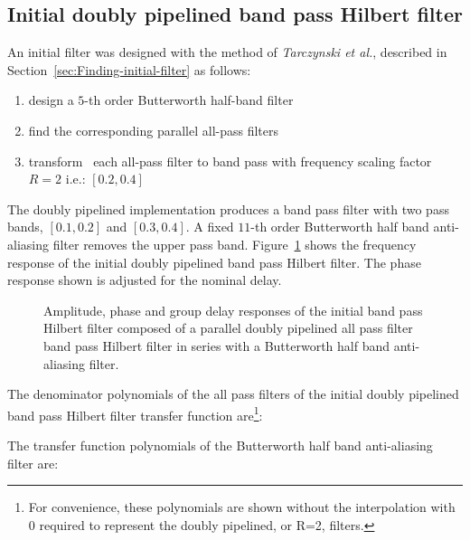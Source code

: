 \documentclass[a4paper,twoside,10pt,english]{article}
\newcommand{\DesignOfSchurLatticeFiltersPdfScale}{1}
\begin{document}
\subsection{Initial doubly pipelined band pass Hilbert filter}
An initial filter was designed with the method of \emph{Tarczynski et al.},
described in Section~\ref{sec:Finding-initial-filter} as follows:
\begin{enumerate}
\item design a $5$-th order Butterworth half-band filter
\item find the corresponding parallel all-pass
  filters~\cite{VaidyanathanMitraNuevo_LowSensitivityIIRDigitalFilters}
\item transform~\cite[Problem 6.26]{RobertsMullis_DigitalSignalProcessing} each
  all-pass filter to band pass with frequency scaling factor $R=2$ i.e.:
  $\left[0.2,0.4\right]$
\end{enumerate}
The doubly pipelined implementation produces a band pass filter with two
pass bands,  $\left[0.1,0.2\right]$ and $\left[0.3,0.4\right]$. A fixed
$11$-th order Butterworth half band anti-aliasing filter removes the upper
pass band. Figure~\ref{fig:parallel-allpass-band-pass-Hilbert-R2-initial}
shows the frequency response of the initial doubly pipelined band pass Hilbert filter.
The phase response shown is adjusted for the nominal delay.
\begin{figure}
\centering
\scalebox{\DesignOfSchurLatticeFiltersPdfScale}{}
\caption{Amplitude, phase and group delay responses of the initial 
  band pass Hilbert filter composed of a parallel doubly pipelined all pass
  filter band pass Hilbert filter in series with a Butterworth half band
  anti-aliasing filter.}
\label{fig:parallel-allpass-band-pass-Hilbert-R2-initial}
\end{figure}
The denominator polynomials of the all pass filters of the initial doubly
pipelined band pass Hilbert filter transfer function are\footnote{For
  convenience, these polynomials are shown without the interpolation
  with $0$ required to represent the doubly pipelined, or R=2, filters.}:
\begin{small}


\end{small}
The transfer function polynomials of the Butterworth half band anti-aliasing
filter are:
\begin{small}


\end{small}
\end{document}
